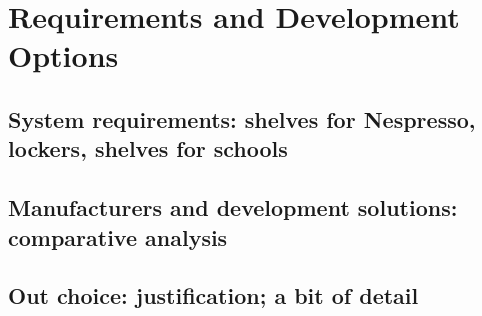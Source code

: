 \chapter{Requirements and Development Options}

\section{System requirements: shelves for Nespresso, lockers, shelves for schools}

\section{Manufacturers and development solutions: comparative analysis}

\section{Out choice: justification; a bit of detail}
